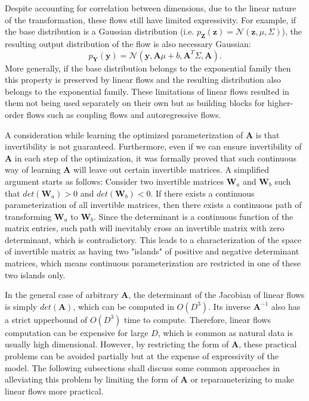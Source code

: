 Despite accounting for correlation between dimensions, due to the linear nature
of the transformation, these flows still have limited expressivity. For example, if the base
distribution is a Gaussian distribution (i.e. $p_{\mathbf{Z}}(\mathbf{z}) =
\mathcal{N}(\mathbf{z}, \mu, \Sigma)$), the resulting output distribution of the
flow is also necessary Gaussian:
$$
p_{\mathbf{Y}}(\mathbf{y}) = \mathcal{N}(\mathbf{y}, \mathbf{A}\mu + b, \mathbf{A}^T \Sigma,
\mathbf{A})
.$$
More generally, if the base distribution belongs to the exponential family then
this property is preserved by linear flows and the resulting distribution also
belongs to the exponential family. These limitations of linear flows resulted in
them not being used separately on their own but as building blocks for
higher-order flows such as coupling flows and autoregressive flows.

A consideration while learning the optimized parameterization of $\mathbf{A}$ is
that invertibility is not guaranteed. Furthermore, even if we can ensure
invertibility of $\mathbf{A}$ in each step of the optimization, it was
formally proved that such continuous way of learning $\mathbf{A}$ will leave out
certain invertible matrices. A simplified argument starts as follows: Consider two
invertible matrices $\mathbf{W}_a$ and $\mathbf{W}_b$ such that
$det(\mathbf{W}_a) > 0$ and $det(\mathbf{W}_b) < 0$. If there exists a
continuous parameterization of all invertible matrices, then there exists a
continuous path of transforming $\mathbf{W}_a$ to $\mathbf{W}_b$. Since the
determinant is a continuous function of the matrix entries, such path will
inevitably cross an invertible matrix with zero determinant, which is
contradictory. This leads to a characterization of the space of invertible
matrix as having two "islands" of positive and negative determinant matrices, which
means continuous parameterization are restricted in one of these two
islands only.

In the general case of arbitrary $\textbf{A}$, the determinant of the Jacobian
of linear flows is simply $det(\mathbf{A})$, which can be computed in $O(D^3)$.
Its inverse $\mathbf{A}^{-1}$ also has a strict upperbound of $O(D^3)$ time to
compute. Therefore, linear flows computation can be expensive for large $D$,
which is common as natural data is usually high dimensional. However, by
restricting the form of $\textbf{A}$, these practical problems can be avoided
partially but at the expense of expressivity of the model. The following
subsections shall discuss some common approaches in alleviating this problem by
limiting the form of $\mathbf{A}$ or reparameterizing to make
linear flows more practical.

